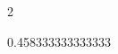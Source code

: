 \documentclass[gps1,twoside]{article}
\begin{document}
\begin{multicols}{2}
\begin{spacing}{0.458333333333333}{\raggedright}
\begin{spacing}{0.5}
road.}\spantranslationtranslationtranslationsexampleexamplessensesensessensesensessubentrysubentriesentrylastchildaftertranslationtranslationspanexampleexampleexamplessensesensessensesensessubentrysubentriesentryexamplespansensespanspandiventryletData{ }\translationaftertranslationspanexampleexampleexamplessensesensessensesensessubentrysubentriesentryexamplespansensespanspandiventryletData{}\translationafterspanexampleexampleexamplessensesensessensesensessubentrysubentriesentryexamplespansensespanspandiventryletData{}\spanexampleexampleexamplessensesensessensesensessubentrysubentriesentrylastchildafterexamplespansensespanspandiventryletData{}\exampleafterspansensespanspandiventryletData{}\examplessensesensesentryaftersensespanspandiventryletData{}\sensesentryafterdiventryletData{}\end{spacing}
 \end{spacing}\end{multicols}
\end{document}
